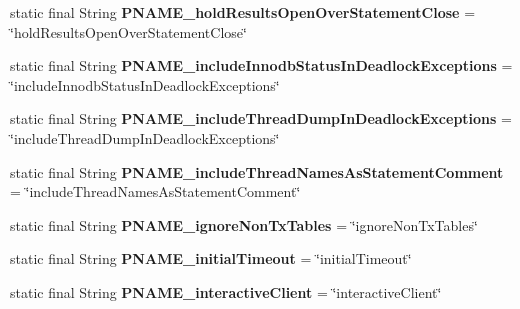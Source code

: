 \begin{DoxyCompactItemize}
static final String {\bfseries P\+N\+A\+M\+E\+\_\+hold\+Results\+Open\+Over\+Statement\+Close} = \char`\"{}hold\+Results\+Open\+Over\+Statement\+Close\char`\"{}
\item 
\mbox{\label{classcom_1_1mysql_1_1cj_1_1conf_1_1_property_definitions_a8e25e18033437b2281ff705223ba6b95}} 
static final String {\bfseries P\+N\+A\+M\+E\+\_\+include\+Innodb\+Status\+In\+Deadlock\+Exceptions} = \char`\"{}include\+Innodb\+Status\+In\+Deadlock\+Exceptions\char`\"{}
\item 
\mbox{\label{classcom_1_1mysql_1_1cj_1_1conf_1_1_property_definitions_aee831ef7e28cc7a42c880b4d548103f4}} 
static final String {\bfseries P\+N\+A\+M\+E\+\_\+include\+Thread\+Dump\+In\+Deadlock\+Exceptions} = \char`\"{}include\+Thread\+Dump\+In\+Deadlock\+Exceptions\char`\"{}
\item 
\mbox{\label{classcom_1_1mysql_1_1cj_1_1conf_1_1_property_definitions_aa7917324423f7f4c6e886c494b71dbdd}} 
static final String {\bfseries P\+N\+A\+M\+E\+\_\+include\+Thread\+Names\+As\+Statement\+Comment} = \char`\"{}include\+Thread\+Names\+As\+Statement\+Comment\char`\"{}
\item 
\mbox{\label{classcom_1_1mysql_1_1cj_1_1conf_1_1_property_definitions_a9d13abad96d517203e39042258a1ad56}} 
static final String {\bfseries P\+N\+A\+M\+E\+\_\+ignore\+Non\+Tx\+Tables} = \char`\"{}ignore\+Non\+Tx\+Tables\char`\"{}
\item 
\mbox{\label{classcom_1_1mysql_1_1cj_1_1conf_1_1_property_definitions_a77d016898d747fee3b6b2bc984eb3c0a}} 
static final String {\bfseries P\+N\+A\+M\+E\+\_\+initial\+Timeout} = \char`\"{}initial\+Timeout\char`\"{}
\item 
\mbox{\label{classcom_1_1mysql_1_1cj_1_1conf_1_1_property_definitions_a4edbe9e755486fdca0dd76c75cdb1d49}} 
static final String {\bfseries P\+N\+A\+M\+E\+\_\+interactive\+Client} = \char`\"{}interactive\+Client\char`\"{}
\item 

\end{DoxyCompactItemize}

